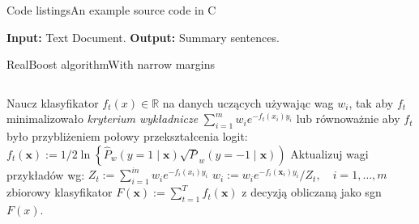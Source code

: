 \documentclass[aspectratio=169]{beamer}
\begin{document}
\begin{frame}{Code listings}{An example source code in C}
    \sleepSort
\end{frame}

\begin{frame}
	\begin{algorithm}[H]
		\caption{Text Summarization Algorithm}\label{euclid}
		\begin{algorithmic}[1]
			\newline
			\textbf{Input:} Text Document.\newline
			\textbf{Output:} Summary sentences.
			\EndProcedure
		\end{algorithmic}
		\label{alg_1}
	\end{algorithm}
\end{frame}

\begin{frame}{RealBoost algorithm}{With narrow margins}
	  \begin{columns}
		\column{\dimexpr\paperwidth-10pt}
		\begin{algorithm}[H]
			\caption{Algorytm RealBoost}\label{realboost}
			\small
			\begin{algorithmic}[1]
					\State Naucz klasyfikator $f_t(x) \in \mathds{R}$ na danych uczących używając wag $w_i$, tak aby $f_t$ minimalizowało \emph{kryterium wykładnicze} $\sum_{i=1}^{m} w_i e^{-f_t(x_i)y_i}$ lub równoważnie aby $f_t$ było przybliżeniem połowy przekształcenia logit:
					\Statex $f_{t}(\mathbf{x}):=1 / 2 \ln \left\{\widehat{P}_{w}(y=1 \mid \mathbf{x}) \sqrt{P}_{w}(y=-1 \mid \mathbf{x})\right)$
					\State Aktualizuj wagi przykładów wg:
					\Statex $Z_{t}:=\sum_{i=1}^{i n} w_{i} e^{-f_{i}\left(x_{i}\right) y_{i}}$
					\Statex $w_{i}:=w_{i} e^{-f_{i}\left(\mathbf{x}_{i}\right) y_{i}} / Z_{t}, \quad i=1, \ldots, m$
				\EndFor\\
				\Return zbiorowy klasyfikator $F(\mathbf{x}):=\sum_{t=1}^{T} f_{t}(\mathbf{x})$ z decyzją obliczaną jako sgn $F(x)$.
				\EndProcedure
			\end{algorithmic}
			\label{alg_2}
		\end{algorithm}
	\end{columns}
\end{frame}
\end{document}
